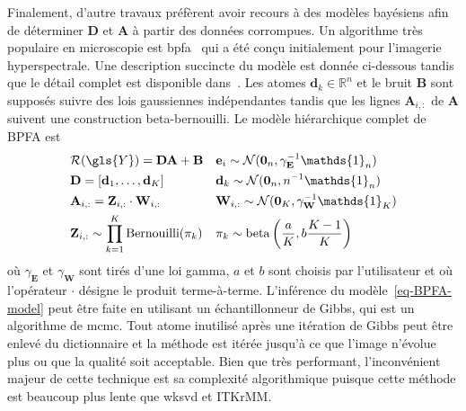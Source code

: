 Finalement, d'autre travaux préfèrent avoir recours à des modèles bayésiens afin de déterminer $\mathbf{D}$ et $\mathbf{A}$ à partir des données corrompues. Un algorithme très populaire en microscopie est \gls{bpfa}~\cite{xing2012siam} qui a été conçu initialement pour l'imagerie hyperspectrale. Une description succincte du modèle est donnée ci-dessous tandis que le détail complet est disponible dans~\cite{xing2012siam}. Les atomes $\mathbf{d}_k\in\mathbb{R}^n$ et le bruit $\mathbf{B}$ sont supposés suivre des lois gaussiennes indépendantes tandis que les lignes $\mathbf{A}_{i, :}$ de $\mathbf{A}$ suivent une construction beta-bernouilli. Le modèle hiérarchique complet de BPFA est
\begin{equation}\label{eq-BPFA-model}
\begin{aligned}
    &\mathcal{R}(\gls{Y}) = \mathbf{D A + B} 
    &&\mathbf{e}_i\sim\mathcal{N}(\mathbf{0}_n, \gamma_\mathbf{E}^{-1}\mathds{1}_n)\\
    &\mathbf{D} = [\mathbf{d}_1, \dots, \mathbf{d}_K]
    &&\mathbf{d}_k\sim\mathcal{N}(\mathbf{0}_n, n^{-1}\mathds{1}_n)\\
    &\mathbf{A}_{i, :} = \mathbf{Z}_{i, :}\cdot \mathbf{W}_{i, :}
    &&\mathbf{W}_{i, :}\sim\mathcal{N}(\mathbf{0}_K, \gamma_\mathbf{W}^{-1}\mathds{1}_K)\\
    &\mathbf{Z}_{i, :}\sim \prod_{k=1}^{K}\mathrm{Bernouilli}(\pi_k)
    &&\pi_k\sim\mathrm{beta}\left( \frac{a}{K}, b\frac{K-1}{K} \right)
\end{aligned}
\end{equation}
où $\gamma_\mathbf{E}$ et $\gamma_\mathbf{W}$ sont tirés d'une loi gamma, $a$ et $b$ sont choisis par l'utilisateur et où l'opérateur $\cdot$ désigne le produit terme-à-terme. L'inférence du modèle~\eqref{eq-BPFA-model} peut être faite en utilisant un échantillonneur de Gibbs, qui est un algorithme de \gls{mcmc}. Tout atome inutilisé après une itération de Gibbs peut être enlevé du dictionnaire et la méthode est itérée jusqu'à ce que l'image n'évolue plus ou que la qualité soit acceptable. Bien que très performant, l'inconvénient majeur de cette technique est sa complexité algorithmique puisque cette méthode est beaucoup plus lente que \gls{wksvd} et ITKrMM.

